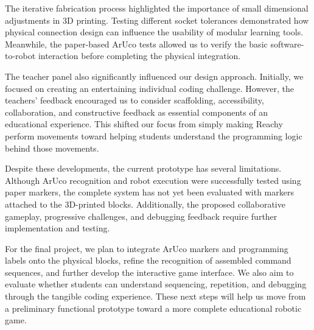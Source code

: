 \documentclass[conference]{IEEEtran}
\begin{document}
The iterative fabrication process highlighted the importance of small dimensional adjustments in 3D printing. Testing different socket tolerances demonstrated how physical connection design can influence the usability of modular learning tools. Meanwhile, the paper-based ArUco tests allowed us to verify the basic software-to-robot interaction before completing the physical integration.

The teacher panel also significantly influenced our design approach. Initially, we focused on creating an entertaining individual coding challenge. However, the teachers' feedback encouraged us to consider scaffolding, accessibility, collaboration, and constructive feedback as essential components of an educational experience. This shifted our focus from simply making Reachy perform movements toward helping students understand the programming logic behind those movements.

Despite these developments, the current prototype has several limitations. Although ArUco recognition and robot execution were successfully tested using paper markers, the complete system has not yet been evaluated with markers attached to the 3D-printed blocks. Additionally, the proposed collaborative gameplay, progressive challenges, and debugging feedback require further implementation and testing.

For the final project, we plan to integrate ArUco markers and programming labels onto the physical blocks, refine the recognition of assembled command sequences, and further develop the interactive game interface. We also aim to evaluate whether students can understand sequencing, repetition, and debugging through the tangible coding experience. These next steps will help us move from a preliminary functional prototype toward a more complete educational robotic game.
\end{document}
